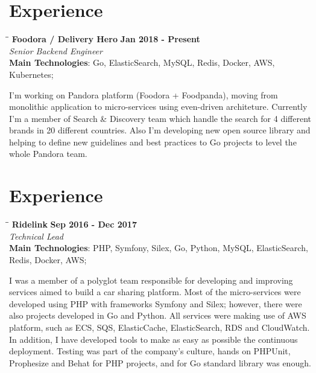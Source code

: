\documentclass[margin]{res}
\begin{document}
\begin{resume}
\section{Experience}
\vspace{-0.1in}
    \begin{tabbing}
    \hspace{2.3in}\= \hspace{1.7in}\= \kill %
    \textbf{Foodora / Delivery Hero}    \>\>\textbf{Jan 2018 - Present}\\
    \textit{Senior Backend Engineer}\\
    \textbf{Main Technologies}: Go, ElasticSearch, MySQL, Redis, Docker, AWS, Kubernetes;
    \end{tabbing}\vspace{-20pt}      %
    \vspace{2mm}
I'm working on Pandora platform (Foodora + Foodpanda), moving from monolithic application to micro-services using even-driven architeture. Currently I'm a member of Search \& Discovery team which handle the search for 4 different brands in 20 different countries.
Also I'm developing new open source library and helping to define new guidelines and best practices to Go projects to level the whole Pandora team.

\section{Experience}
\vspace{-0.1in}
    \begin{tabbing}
    \hspace{2.3in}\= \hspace{1.7in}\= \kill %
    \textbf{Ridelink}    \>\>\textbf{Sep 2016 - Dec 2017}\\
    \textit{Technical Lead}\\
    \textbf{Main Technologies}: PHP, Symfony, Silex, Go, Python, MySQL, ElasticSearch, \\Redis, Docker, AWS;
    \end{tabbing}\vspace{-20pt}      %
    \vspace{2mm}
I was a member of a polyglot team responsible for developing and improving services aimed to build a car sharing platform. Most of the micro-services were developed using PHP with frameworks Symfony and Silex; however, there were also projects developed in Go and Python. All services were making use of AWS platform, such as ECS, SQS, ElasticCache, ElasticSearch, RDS and CloudWatch. In addition, I have developed tools to make as easy as possible the continuous deployment. Testing was part of the company’s culture, hands on PHPUnit, Prophesize and Behat for PHP projects, and for Go standard library was enough.


\end{resume}
\end{document}
